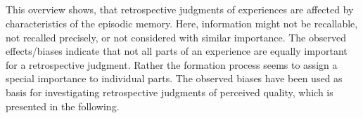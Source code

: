 \subparagraph*{}
This overview shows, that retrospective judgments of experiences are affected by characteristics of the episodic memory.
Here, information might not be recallable, not recalled precisely, or not considered with similar importance.
The observed effects/biases indicate that not all parts of an experience are equally important for a retrospective judgment.
Rather the formation process seems to assign a special importance to individual parts.
The observed biases have been used as basis for investigating retrospective judgments of perceived quality, which is presented in the following.
